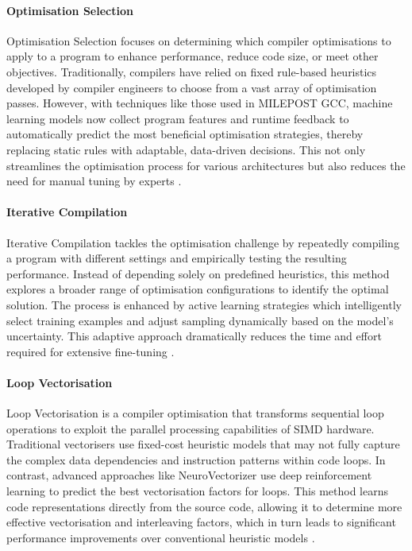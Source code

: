 \paragraph{Optimisation Selection} Optimisation Selection focuses on determining which compiler optimisations to apply to a program to enhance performance, reduce code size, or meet other objectives. Traditionally, compilers have relied on fixed rule-based heuristics developed by compiler engineers to choose from a vast array of optimisation passes. However, with techniques like those used in MILEPOST GCC, machine learning models now collect program features and runtime feedback to automatically predict the most beneficial optimisation strategies, thereby replacing static rules with adaptable, data-driven decisions. This not only streamlines the optimisation process for various architectures but also reduces the need for manual tuning by experts \cite{OptimisationSelectionML}.

\paragraph{Iterative Compilation} Iterative Compilation tackles the optimisation challenge by repeatedly compiling a program with different settings and empirically testing the resulting performance. Instead of depending solely on predefined heuristics, this method explores a broader range of optimisation configurations to identify the optimal solution. The process is enhanced by active learning strategies which intelligently select training examples and adjust sampling dynamically based on the model's uncertainty. This adaptive approach dramatically reduces the time and effort required for extensive fine-tuning \cite{IterativeCompilationWActiveLearningML}.

\paragraph{Loop Vectorisation} Loop Vectorisation is a compiler optimisation that transforms sequential loop operations to exploit the parallel processing capabilities of SIMD hardware. Traditional vectorisers use fixed-cost heuristic models that may not fully capture the complex data dependencies and instruction patterns within code loops. In contrast, advanced approaches like NeuroVectorizer use deep reinforcement learning to predict the best vectorisation factors for loops. This method learns code representations directly from the source code, allowing it to determine more effective vectorisation and interleaving factors, which in turn leads to significant performance improvements over conventional heuristic models \cite{LoopVectorisationML}.

